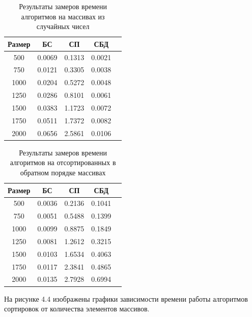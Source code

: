 \begin{table}[h]
	\begin{center}
		\caption{\label{tab:time2}Результаты замеров времени алгоритмов на массивах из случайных чисел}
		\begin{tabular}{|c|c|c|c|c|}
		\hline
		Размер & БС &  СП & СБД \\
		\hline
		500  & 0.0069 & 0.1313 & 0.0021\\
		\hline
		750  & 0.0121 & 0.3305 & 0.0038\\
		\hline
		1000  & 0.0204 & 0.5272 & 0.0048\\
		\hline
		1250  & 0.0286 & 0.8101 & 0.0061\\
		\hline
		1500  & 0.0383 & 1.1723 & 0.0072\\ 
		\hline
		1750  & 0.0511 & 1.7372 &  0.0082\\
		\hline
		2000  & 0.0656 & 2.5861 & 0.0106 \\
		\hline
		\end{tabular}
	\end{center}
\end{table}

\begin{table}[h]
	\begin{center}
		\caption{\label{tab:time3}Результаты замеров времени алгоритмов на отсортированных в обратном порядке массивах}
		\begin{tabular}{|c|c|c|c|c|}
		\hline
		Размер & БС &  СП & СБД \\
		\hline
		500  & 0.0036 & 0.2136 & 0.1041\\
		\hline
		750  & 0.0051 & 0.5488 & 0.1399\\
		\hline
		1000  & 0.0099 & 0.8875 & 0.1849\\
		\hline
		1250  & 0.0081 & 1.2612 & 0.3215\\
		\hline
		1500  & 0.0103 & 1.6534 & 0.4063\\ 
		\hline
		1750  & 0.0117 & 2.3841 &  0.4865\\
		\hline
		2000  & 0.0135 & 2.7928 & 0.6994 \\
		\hline
		\end{tabular}
	\end{center}
\end{table}

На рисунке 4.4 изображены графики зависимости времени работы алгоритмов сортировок от количества элементов массивов. 


